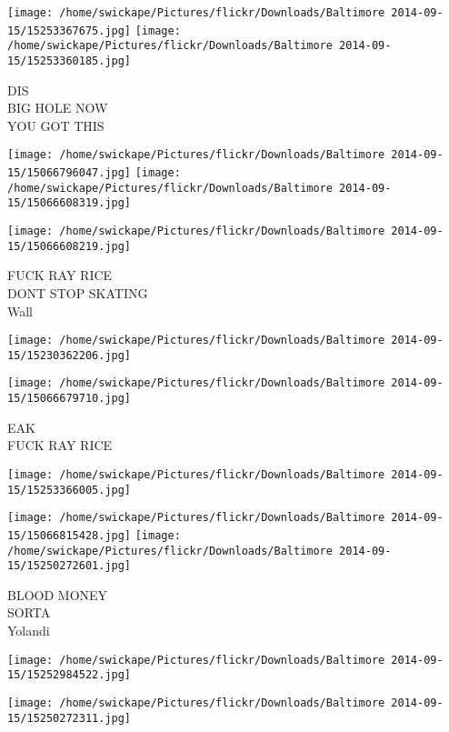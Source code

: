 \documentclass[10pt,letterpaper]{article}
\begin{document}
\vspace{0.25in}
\texttt{[image: /home/swickape/Pictures/flickr/Downloads/Baltimore 2014-09-15/15253367675.jpg]}
\texttt{[image: /home/swickape/Pictures/flickr/Downloads/Baltimore 2014-09-15/15253360185.jpg]}

DIS\\
BIG HOLE NOW\\
YOU GOT THIS
\pagebreak

\texttt{[image: /home/swickape/Pictures/flickr/Downloads/Baltimore 2014-09-15/15066796047.jpg]}
\texttt{[image: /home/swickape/Pictures/flickr/Downloads/Baltimore 2014-09-15/15066608319.jpg]}

\vspace{0.25in}
\texttt{[image: /home/swickape/Pictures/flickr/Downloads/Baltimore 2014-09-15/15066608219.jpg]}

FUCK RAY RICE\\
DONT STOP SKATING\\
Wall
\pagebreak

\texttt{[image: /home/swickape/Pictures/flickr/Downloads/Baltimore 2014-09-15/15230362206.jpg]}

\vspace{0.25in}
\texttt{[image: /home/swickape/Pictures/flickr/Downloads/Baltimore 2014-09-15/15066679710.jpg]}

EAK\\
FUCK RAY RICE
\pagebreak

\texttt{[image: /home/swickape/Pictures/flickr/Downloads/Baltimore 2014-09-15/15253366005.jpg]}

\vspace{0.25in}
\texttt{[image: /home/swickape/Pictures/flickr/Downloads/Baltimore 2014-09-15/15066815428.jpg]}
\texttt{[image: /home/swickape/Pictures/flickr/Downloads/Baltimore 2014-09-15/15250272601.jpg]}

BLOOD MONEY\\
SORTA\\
Yolandi
\pagebreak

\texttt{[image: /home/swickape/Pictures/flickr/Downloads/Baltimore 2014-09-15/15252984522.jpg]}

\vspace{0.25in}
\texttt{[image: /home/swickape/Pictures/flickr/Downloads/Baltimore 2014-09-15/15250272311.jpg]}
\end{document}
